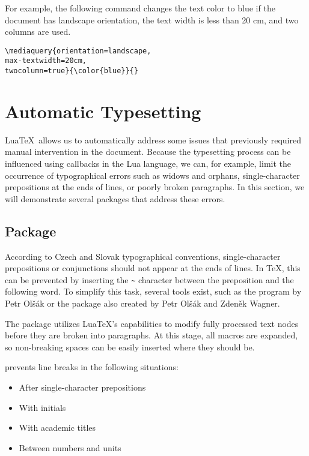 \documentclass{ltugboat}
\begin{document}
For example, the following command changes the text color to blue if the document has landscape orientation, the text width is less than 20 cm, and two columns are used.

\begin{verbatim}
\mediaquery{orientation=landscape,
max-textwidth=20cm,
twocolumn=true}{\color{blue}}{}
\end{verbatim}


\section{Automatic Typesetting}

Lua\TeX\ allows us to automatically address some issues that previously required manual intervention in the document. Because the typesetting process can be influenced using callbacks in the Lua language, we can, for example, limit the occurrence of typographical errors such as widows and orphans, single-character prepositions at the ends of lines, or poorly broken paragraphs. In this section, we will demonstrate several packages that address these errors.

\subsection{ Package}

According to Czech and Slovak typographical conventions, single-character prepositions or conjunctions should not appear at the ends of lines. In \TeX, this can be prevented by inserting the \verb|~| character between the preposition and the following word. To simplify this task, several tools exist, such as the  program by Petr Olšák or the  package also created by Petr Olšák and Zdeněk Wagner.

The  package \cite{luavlna} utilizes Lua\TeX's capabilities to modify fully processed text nodes before they are broken into paragraphs. At this stage, all macros are expanded, so non-breaking spaces can be easily inserted where they should be.

 prevents line breaks in the following situations:

\begin{itemize}
  \item After single-character prepositions
  \item With initials
  \item With academic titles
  \item Between numbers and units
\end{itemize}
\end{document}
